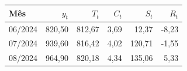 \begin{tabular}{lrrrrr}
\toprule
Mês & $y_t$ & $T_t$ & $C_t$ & $S_t$ & $R_t$ \\
\midrule
06/2024 & 820,50 & 812,67 & 3,69 & 12,37 & -8,23 \\
07/2024 & 939,60 & 816,42 & 4,02 & 120,71 & -1,55 \\
08/2024 & 964,90 & 820,18 & 4,34 & 135,06 & 5,33 \\
\bottomrule
\end{tabular}
